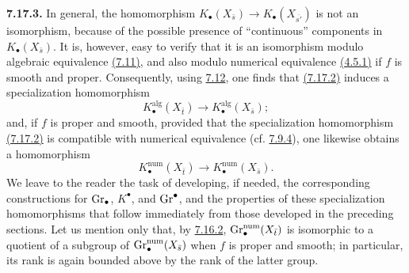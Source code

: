 \textbf{7.17.3.}
In general, the homomorphism
$K_\bullet(X_{\bar s})\to K_\bullet(X_{\overline{s'}})$ is not an
isomorphism, because of the possible presence of ``continuous'' components
in $K_\bullet(X_{\bar s})$. It is, however, easy to verify that it is an
isomorphism modulo algebraic equivalence \hyperlink{sga6.e10.para.7-11}{(7.11)}, and also modulo numerical
equivalence \hyperlink{sga6.e10.def.4-5-1}{(4.5.1)} if $f$ is smooth and proper. Consequently, using \hyperlink{sga6.e10.para.7-12}{7.12},
one finds that \hyperlink{sga6.e10.eq.7-17-2}{(7.17.2)} induces a specialization homomorphism
\begin{equation}\tag{7.17.3.1}
K_\bullet^{\mathrm{alg}}(X_{\bar t})
  \longrightarrow K_\bullet^{\mathrm{alg}}(X_{\bar s});
\end{equation}
and, if $f$ is proper and smooth, provided that the specialization
homomorphism \hyperlink{sga6.e10.eq.7-17-2}{(7.17.2)} is compatible with numerical equivalence (cf. \hyperlink{sga6.e10.para.7-9-4}{7.9.4}),
one likewise obtains a homomorphism
\begin{equation}\tag{7.17.3.2}
K_\bullet^{\mathrm{num}}(X_{\bar t})
  \longrightarrow K_\bullet^{\mathrm{num}}(X_{\bar s}).
\end{equation}
We leave to the reader the task of developing, if needed, the corresponding
constructions for $\operatorname{Gr}_\bullet$, $K^\bullet$, and $\operatorname{Gr}^\bullet$, and the
properties of these specialization homomorphisms that follow immediately
from those developed in the preceding sections. Let us mention only
that, by \hyperlink{sga6.e10.para.7-16-2}{7.16.2}, $\operatorname{Gr}_\bullet^{\mathrm{num}}(X_{\bar t})$ is isomorphic to a
quotient of a subgroup of $\operatorname{Gr}_\bullet^{\mathrm{num}}(X_{\bar s})$ when $f$
is proper and smooth; in particular, its rank is again bounded above by the
rank of the latter group.

